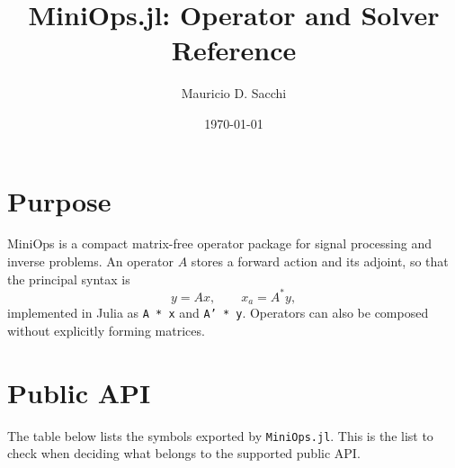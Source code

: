 \documentclass[11pt]{article}
\title{MiniOps.jl: Operator and Solver Reference}
\author{Mauricio D. Sacchi}
\date{\today}
\begin{document}
\maketitle

\section{Purpose}
MiniOps is a compact matrix-free operator package for signal processing and
inverse problems.  An operator $A$ stores a forward action and its adjoint,
so that the principal syntax is
\[
    y = A x, \qquad x_a = A^* y,
\]
implemented in Julia as \texttt{A * x} and \texttt{A' * y}.  Operators can
also be composed without explicitly forming matrices.

\section{Public API}
The table below lists the symbols exported by \texttt{MiniOps.jl}.  This is
the list to check when deciding what belongs to the supported public API.
\end{document}
